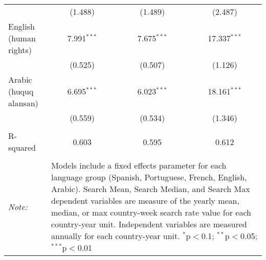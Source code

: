 \begin{table}[!htbp]
\begin{tabular}{@{\extracolsep{5pt}}lccc}
  & (1.488) & (1.489) & (2.487) \\ 
  English (human rights) & 7.991$^{***}$ & 7.675$^{***}$ & 17.337$^{***}$ \\ 
  & (0.525) & (0.507) & (1.126) \\ 
  Arabic (huquq alansan) & 6.695$^{***}$ & 6.023$^{***}$ & 18.161$^{***}$ \\ 
  & (0.559) & (0.534) & (1.346) \\ 
 \hline \\[-1.8ex] 
R-squared  & 0.603 & 0.595 & 0.612 \\ 
\hline 
\hline \\[-1.8ex] 
\textit{Note:}  & \multicolumn{3}{l}{\parbox[t]{8cm}{Models include a fixed effects parameter for each language group (Spanish, Portuguese, French, English, Arabic). Search Mean, Search Median, and Search Max dependent variables are measure of the yearly mean, median, or max country-week search rate value for each country-year unit. Independent variables are measured annually for each country-year unit. $^{*}$p$<$0.1; $^{**}$p$<$0.05; $^{***}$p$<$0.01}} \\ 
\end{tabular} 
\end{table} 
